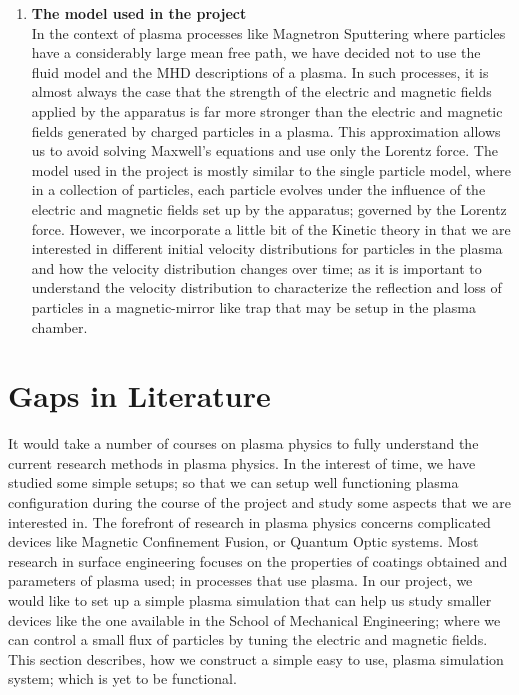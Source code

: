 \documentclass[12pt]{article}
\begin{document}
\begin{enumerate}
		\item \textbf{The model used in the project} \\
		In the context of plasma processes like Magnetron Sputtering where particles have a considerably large mean free path, we have decided not to use the fluid model and the MHD descriptions of a plasma. In such processes, it is almost always the case that the strength of the electric and magnetic fields applied by the apparatus is far more stronger than the electric and magnetic fields generated by charged particles in a plasma. This approximation allows us to avoid solving Maxwell's equations and use only the Lorentz force. The model used in the project is mostly similar to the single particle model, where in a collection of particles, each particle evolves under the influence of the electric and magnetic fields set up by the apparatus; governed by the Lorentz force. However, we incorporate a little bit of the Kinetic theory in that we are interested in different initial velocity distributions for particles in the plasma and how the velocity distribution changes over time; as it is important to understand the velocity distribution to characterize the reflection and loss of particles in a magnetic-mirror like trap that may be setup in the plasma chamber.  
		
	\end{enumerate}
	
	\section{Gaps in Literature}
	It would take a number of courses on plasma physics to fully understand the current research methods in plasma physics. In the interest of time, we have studied some simple setups; so that we can setup well functioning plasma configuration during the course of the project and study some aspects that we are interested in. The forefront of research in plasma physics concerns complicated devices like Magnetic Confinement Fusion, or Quantum Optic systems. Most research in surface engineering focuses on the properties of coatings obtained and parameters of plasma used; in processes that use plasma. In our project, we would like to set up a simple plasma simulation that can help us study smaller devices like the one available in the School of Mechanical Engineering; where we can control a small flux of particles by tuning the electric and magnetic fields. This section describes, how we construct a simple easy to use, plasma simulation system; which is yet to be functional.
	
\end{document}

